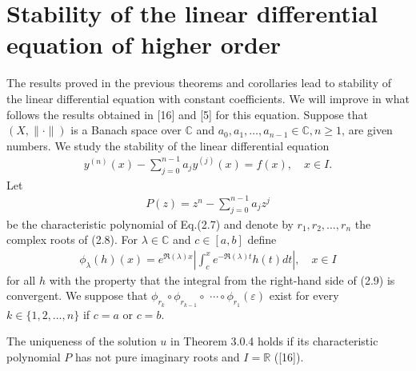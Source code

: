 \documentclass[a4paper,12pt]{report}
\begin{document}
\section{Stability of the linear differential equation of higher order}	
\quad  The results proved in the previous theorems and corollaries lead to stability of the linear differential equation with constant coefficients. We will improve in what follows the results obtained in [16] and [5] for this equation. Suppose that $(X,\|\cdot\|)$ is a Banach space over $\mathbb{C}$ and $a_{0}, a_{1}, \ldots, a_{n-1} \in \mathbb{C}, n \ge 1$, are given numbers. We study the stability of the linear differential equation	
\begin{eqnarray}
	y^{(n)}(x)-\sum_{j=0}^{n-1} a_{j} y^{(j)}(x)=f(x), \quad x \in I.
\end{eqnarray}
Let 
\begin{eqnarray}
	P(z)=z^{n}-\sum_{j=0}^{n-1} a_{j} z^{j}
\end{eqnarray}
be the characteristic polynomial of Eq.(2.7) and denote by $r_{1}, r_{2}, \ldots, r_{n}$ the complex roots of (2.8). For $\lambda \in \mathbb{C}$ and $c \in[a, b]$ define
\begin{eqnarray}
	\phi_{\lambda}(h)(x)=e^{\Re(\lambda) x}\left|\int_{c}^{x} e^{-\Re(\lambda) t} h(t) d t\right|, \quad x \in I
\end{eqnarray}
for all $h$ with the property that the integral from the right-hand side of (2.9) is convergent. We suppose that $\phi_{r_{k}} \circ \phi_{r_{k-1}} \circ$ $\cdots \circ \phi_{r_{1}}(\varepsilon)$ exist for every $k \in\{1,2, \ldots, n\}$ if $c=a$ or $c=b$. 
\begin{Rem}
 The uniqueness of the solution $u$ in Theorem 3.0.4 holds if its characteristic polynomial $P$ has not pure imaginary roots and $I=\mathbb{R}$  ([16]).
\end{Rem}
\end{document}
